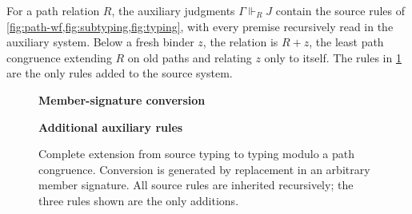 \documentclass[acmsmall,screen,nonacm]{acmart}
\newcommand{\sing}[1]{\{#1\}}
\newcommand{\subst}[3]{#1[#2/#3]}
\newcommand{\struct}{\Vdash}
\newcommand{\judgheader}[3][]{%
  \par\addvspace{0.75em}%
  \noindent\textbf{#2}%
  \if\relax\detokenize{#1}\relax\else\quad #1\fi
  \hfill{\setlength{\fboxsep}{4pt}\setlength{\fboxrule}{0.5pt}%
    \fbox{\(\strut #3\)}}\par
  \nobreak\addvspace{0.85em}%
}
\begin{document}
For a path relation \(R\), the auxiliary judgments
\(\Gamma\struct_R J\) contain the source rules of
\cref{fig:path-wf,fig:subtyping,fig:typing}, with every premise recursively
read in the auxiliary system. Below a fresh binder \(z\), the relation is
\(R+z\), the least path congruence extending \(R\) on old paths and relating
\(z\) only to itself. The rules in \cref{fig:auxiliary} are the only rules
added to the source system.

\begin{figure}[H]
\begin{minipage}{\textwidth}
\judgheader{Member-signature conversion}{\tau_1\cong_R\tau_2}

\judgheader{Additional auxiliary rules}{\Gamma\struct_R J}
\end{minipage}
\caption{Complete extension from source typing to typing modulo a path
congruence. Conversion is generated by replacement in an arbitrary member
signature. All source rules are inherited recursively; the three rules shown
are the only additions.}
\label{fig:auxiliary}
\end{figure}
\end{document}

